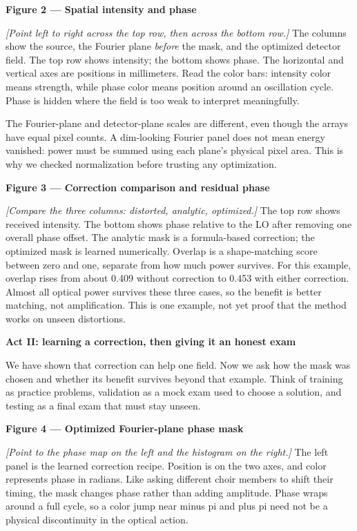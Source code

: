 \documentclass[11pt,letterpaper]{article}
\newcommand{\cue}[1]{\par\textbf{#1}\par}
\newcommand{\stage}[1]{\textit{[#1]}}
\begin{document}
\cue{Figure 2 --- Spatial intensity and phase}
\stage{Point left to right across the top row, then across the bottom row.}
The columns show the source, the Fourier plane \emph{before} the mask, and the optimized detector field. The top row shows intensity; the bottom shows phase. The horizontal and vertical axes are positions in millimeters. Read the color bars: intensity color means strength, while phase color means position around an oscillation cycle. Phase is hidden where the field is too weak to interpret meaningfully.

The Fourier-plane and detector-plane scales are different, even though the arrays have equal pixel counts. A dim-looking Fourier panel does not mean energy vanished: power must be summed using each plane's physical pixel area. This is why we checked normalization before trusting any optimization.

\cue{Figure 3 --- Correction comparison and residual phase}
\stage{Compare the three columns: distorted, analytic, optimized.}
The top row shows received intensity. The bottom shows phase relative to the LO after removing one overall phase offset. The analytic mask is a formula-based correction; the optimized mask is learned numerically. Overlap is a shape-matching score between zero and one, separate from how much power survives. For this example, overlap rises from about 0.409 without correction to 0.453 with either correction. Almost all optical power survives these three cases, so the benefit is better matching, not amplification. This is one example, not yet proof that the method works on unseen distortions.

\newpage
\cue{Act II: learning a correction, then giving it an honest exam}
We have shown that correction can help one field. Now we ask how the mask was chosen and whether its benefit survives beyond that example. Think of training as practice problems, validation as a mock exam used to choose a solution, and testing as a final exam that must stay unseen.

\cue{Figure 4 --- Optimized Fourier-plane phase mask}
\stage{Point to the phase map on the left and the histogram on the right.}
The left panel is the learned correction recipe. Position is on the two axes, and color represents phase in radians. Like asking different choir members to shift their timing, the mask changes phase rather than adding amplitude. Phase wraps around a full cycle, so a color jump near minus pi and plus pi need not be a physical discontinuity in the optical action.
\end{document}
